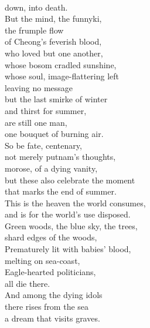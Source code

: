 \documentclass[smalldemyvopaper,11pt,twoside,onecolumn,openright,extrafontsizes]{memoir}
\begin{document}
\\down, into death.
\\But the mind, the funnyki,
\\the frumple flow
\\of Cheong's feverish blood,
\\who loved but one another,
\\whose bosom cradled sunshine,
\\whose soul, image-flattering left
\\leaving no message
\\but the last smirke of winter
\\and thirst for summer,
\\are still one man,
\\one bouquet of burning air.
\\So be fate, centenary,
\\not merely putnam's thoughts,
\\morose, of a dying vanity,
\\but these also celebrate the moment
\\that marks the end of summer.
\\This is the heaven the world consumes,
\\and is for the world's use disposed.
\\Green woods, the blue sky, the trees,
\\shard edges of the woods,
\\Prematurely lit with babies' blood,
\\melting on sea-coast,
\\Eagle-hearted politicians,
\\all die there.
\\And among the dying idols
\\there rises from the sea
\\a dream that visits graves.
\end{document}
